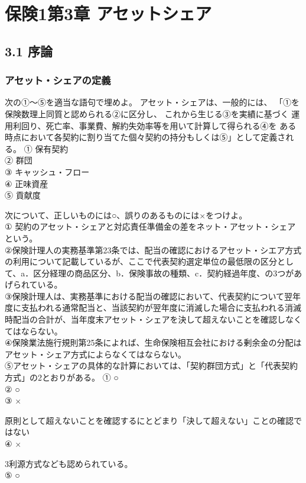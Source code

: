 \documentclass[report,gutter=10mm,fore-edge=10mm,uplatex,dvipdfmx]{jlreq}
\begin{document}
\chapter{保険1第3章 アセットシェア}
\section{3.1 序論}
\subsection{アセット・シェアの定義}
次の①～⑤を適当な語句で埋めよ。
アセット・シェアは、一般的には、
「①を保険数理上同質と認められる②に区分し、
これから生じる③を実績に基づく
運用利回り、死亡率、事業費、解約失効率等を用いて計算して得られる④を
ある時点において各契約に割り当てた個々契約の持分もしくは⑤」として定義される。
\answer{}
\noindent
① 保有契約\\
② 群団\\
③ キャッシュ・フロー\\
④ 正味資産\\
⑤ 貢献度

次について、正しいものには○、誤りのあるものには×をつけよ。\\
① 契約のアセット・シェアと対応責任準備金の差をネット・アセット・シェアという。\\
②保険計理人の実務基準第23条では、配当の確認におけるアセット・シエア方式の利用について記載しているが、ここで代表契約選定単位の最低限の区分として、a．区分経理の商品区分、b．保険事故の種類、c．契約経過年度、の3つがあげられている。\\
③保険計理人は、実務基準における配当の確認において、代表契約について翌年度に支払われる通常配当と、当該契約が翌年度に消滅した場合に支払われる消滅時配当の合計が、当年度末アセット・シェアを決して超えないことを確認しなくてはならない。\\
④保険業法施行規則第25条によれば、生命保険相互会社における剰余金の分配はアセット・シェア方式によらなくてはならない。\\
⑤アセット・シェアの具体的な計算においては、「契約群団方式」と「代表契約方式」の2とおりがある。
\answer{}
\noindent
① ○\\
② ○\\
③ ×

原則として超えないことを確認するにとどまり「決して超えない」ことの確認ではない\\
④ ×

3利源方式なども認められている。\\
⑤ ○
\end{document}
